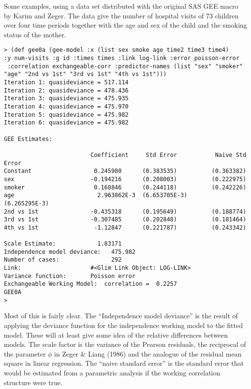 \documentclass[10pt]{article}
\begin{document}
Some examples, using a data set distributed with the original SAS GEE macro by Karim and Zeger. The data give the number of hospital visits of 73 children over four time periods together with the age and sex of the child and the smoking status of the mother.\\
\begin{verbatim}
> (def gee0a (gee-model :x (list sex smoke age time2 time3 time4) 
:y num-visits :g id :times times :link log-link :error poisson-error
 :correlation exchangeable-corr :predictor-names (list "sex" "smoker" 
"age" "2nd vs 1st" "3rd vs 1st" "4th vs 1st")))
Iteration 1: quasideviance = 517.114
Iteration 2: quasideviance = 478.436
Iteration 3: quasideviance = 475.935
Iteration 4: quasideviance = 475.970
Iteration 5: quasideviance = 475.982
Iteration 6: quasideviance = 475.982

GEE Estimates:

                         Coefficient     Std Error           Naive Std Error
Constant                  0.245980      (0.383535)          (0.363382)
sex                      -0.194216      (0.208003)          (0.222975)
smoker                    0.168846      (0.244118)          (0.242226)
age                        2.963862E-3  (6.653705E-3)       (6.265295E-3)
2nd vs 1st               -0.435318      (0.195649)          (0.188774)
3rd vs 1st               -0.307485      (0.202848)          (0.181464)
4th vs 1st                -1.12847      (0.221787)          (0.243342)

Scale Estimate:            1.83171    
Independence model deviance:   475.982    
Number of cases:               292
Link:                    #<Glim Link Object: LOG-LINK>
Variance function:       Poisson error
Exchangeable Working Model:  correlation =  0.2257
GEE0A
> 
\end{verbatim}
Most of this is fairly clear. The ``Independence model deviance'' is the result of applying the deviance function for the independence working model to the fitted model. These will at least give some idea of the relative differences between models.  The scale factor is the variance of the Pearson residuals, the reciprocal of the parameter $\phi$ in Zeger \& Liang (1986) and the analogue of the residual mean square in linear regression.  The ``naive standard error'' is the standard error that would be estimated from a parametric analysis if the working correlation structure were true.  
\end{document}
